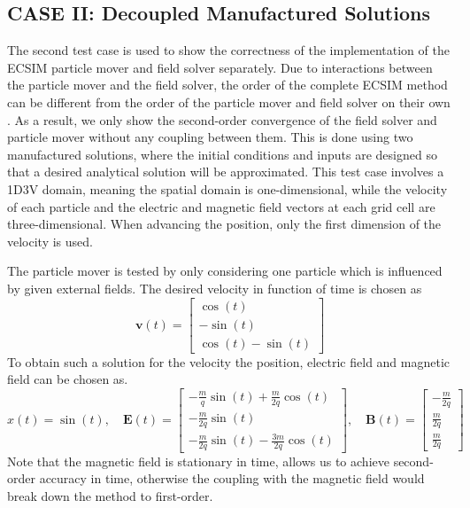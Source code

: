 \subsection{CASE II: Decoupled Manufactured Solutions}
The second test case is used to show the correctness of the implementation of the ECSIM particle mover and field solver separately. Due to interactions between the particle mover and the field solver, the order of the complete ECSIM method can be different from the order of the particle mover and field solver on their own \cite{lapenta_exactly_2017}. As a result, we only show the second-order convergence of the field solver and particle mover without any coupling between them. This is done using two manufactured solutions, where the initial conditions and inputs are designed so that a desired analytical solution will be approximated. This test case involves a 1D3V domain, meaning the spatial domain is one-dimensional, while the velocity of each particle and the electric and magnetic field vectors at each grid cell are three-dimensional. When advancing the position, only the first dimension of the velocity is used.

The particle mover is tested by only considering one particle which is influenced by given external fields. The desired velocity in function of time is chosen as \[
    \textbf{v}(t) = \left[\begin{matrix}
    \cos(t)\\
    -\sin(t)\\
    \cos(t) - \sin(t)
    \end{matrix}\right]
\]
To obtain such a solution for the velocity the position, electric field and magnetic field can be chosen as.
\[
    x(t) = \sin(t), \quad
    \textbf{E}(t) = \left[\begin{matrix}
    -\frac{m}{q}\sin(t) + \frac{m}{2q}\cos(t)\\
    -\frac{m}{2q}\sin(t)\\
    -\frac{m}{2q}\sin(t) - \frac{3m}{2q}\cos(t)
    \end{matrix}\right], \quad \textbf{B}(t) = \left[\begin{matrix}
    -\frac{m}{2q}\\
    \frac{m}{2q}\\
    \frac{m}{2q}
    \end{matrix}\right]
\]
Note that the magnetic field is stationary in time, allows us to achieve second-order accuracy in time, otherwise the coupling with the magnetic field would break down the method to first-order.

